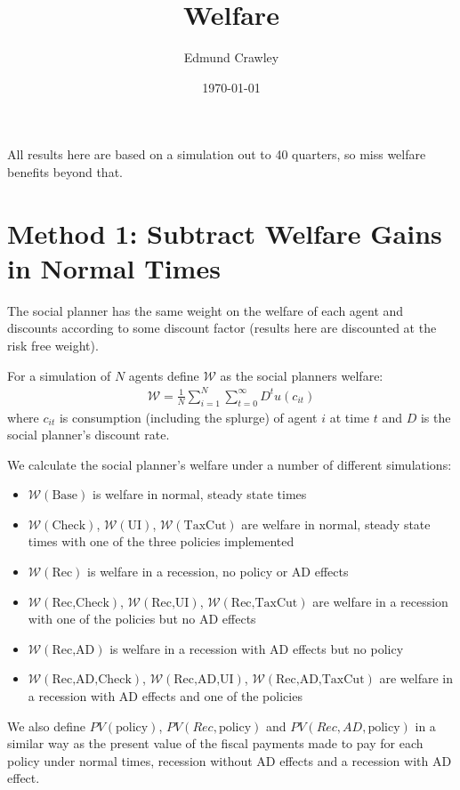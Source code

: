 \documentclass[11pt]{article}
\title{ Welfare}
\author{ Edmund Crawley }
\date{\today}
\begin{document}
	\maketitle
	All results here are based on a simulation out to 40 quarters, so miss welfare benefits beyond that.
		
	\section{Method 1: Subtract Welfare Gains in Normal Times}
	The social planner has the same weight on the welfare of each agent and discounts according to some discount factor (results here are discounted at the risk free weight).
	
	For a simulation of $N$ agents define $\mathcal{W}$ as the social planners welfare:
	\begin{align}
		\mathcal{W} = \frac{1}{N}\sum_{i=1}^{N} \sum_{t=0}^{\infty} D^t u(c_{it})
	\end{align}
	where $c_{it}$ is consumption (including the splurge) of agent $i$ at time $t$ and $D$ is the social planner's discount rate.
	
	We calculate the social planner's welfare under a number of different simulations:
	\begin{itemize} 
		\item  $\mathcal{W}(\text{Base})$ is welfare in normal, steady state times
		\item  $\mathcal{W}(\text{Check})$, $\mathcal{W}(\text{UI})$, $\mathcal{W}(\text{TaxCut})$ are welfare in normal, steady state times with one of the three policies implemented
		\item    $\mathcal{W}(\text{Rec})$ is welfare in a recession, no policy or AD effects
		\item  $\mathcal{W}(\text{Rec,Check})$, $\mathcal{W}(\text{Rec,UI})$, $\mathcal{W}(\text{Rec,TaxCut})$ are welfare in a recession with one of the policies but no AD effects
		\item    $\mathcal{W}(\text{Rec,AD})$ is welfare in a recession with AD effects but no policy
		\item  $\mathcal{W}(\text{Rec,AD,Check})$, $\mathcal{W}(\text{Rec,AD,UI})$, $\mathcal{W}(\text{Rec,AD,TaxCut})$ are welfare in a recession with AD effects and one of the policies
	\end{itemize}
	We also define $PV(\text{policy})$, $PV(Rec,\text{policy})$ and $PV(Rec, AD,\text{policy})$ in a similar way as the present value of the fiscal payments made to pay for each policy under normal times, recession without AD effects and a recession with AD effect.
	
\end{document}
